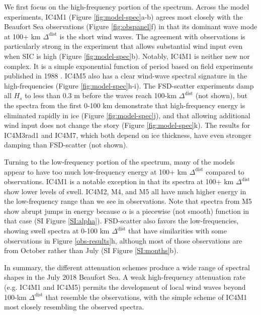 \documentclass [11pt, proquest] {uwthesis}[2020/02/24]
\begin{document}
We first focus on the high-frequency portion of the spectrum. Across the model experiments, IC4M1 (Figure \ref{fig:model-spec}a-b) agrees most closely with the Beaufort Sea observations (Figure \ref{fig:obspanel}f) in that its dominant wave mode at 100+ km $\Delta^{ \mathrm{dist}}$ is the short wind waves. The agreement with observations is particularly strong in the experiment that allows substantial wind input even when SIC is high (Figure \ref{fig:model-spec}b). Notably, IC4M1 is neither new nor complex. It is a simple exponential function of period based on field experiments published in 1988 \cite{Wadhams1988TheZone}. IC4M5 also has a clear wind-wave spectral signature in the high-frequencies (Figure \ref{fig:model-spec}h-i). The FSD-scatter experiments damp all $H_s$ to less than 0.3 m before the waves reach 100-km $\Delta^{ \mathrm{dist}}$ (not shown), but the spectra from the first 0-100 km demonstrate that high-frequency energy is eliminated rapidly in ice (Figure \ref{fig:model-spec}j), and that allowing additional wind input does not change the story (Figure \ref{fig:model-spec}k). The results for IC4M3rad1 and IC4M7, which both depend on ice thickness, have even stronger damping than FSD-scatter (not shown).  

Turning to the low-frequency portion of the spectrum, many of the models appear to have too much low-frequency energy at 100+ km $\Delta^{ \mathrm{dist}}$ compared to observations. IC4M1 is a notable exception in that its spectra at 100+ km $\Delta^{ \mathrm{dist}}$ show lower levels of swell. IC4M2, M4, and M5 all have much higher energy in the low-frequency range than we see in observations. Note that spectra from M5 show abrupt jumps in energy because $\alpha$ is a piecewise (not smooth) function in that case (SI Figure \ref{SI:alpha}). FSD-scatter also favors the low-frequencies, showing swell spectra at 0-100 km $\Delta^{ \mathrm{dist}}$ that have similarities with some observations in Figure \ref{obs-results}h, although most of those observations are from October rather than July (SI Figure \ref{SI:months}b).    

In summary, the different attenuation schemes produce a wide range of spectral shapes in the July 2018 Beaufort Sea. A weak high-frequency attenuation rate (e.g. IC4M1 and IC4M5) permits the development of local wind waves beyond 100-km $\Delta^{ \mathrm{dist}}$ that resemble the observations, with the simple scheme of IC4M1 most closely resembling the observed spectra.  
\end{document}
